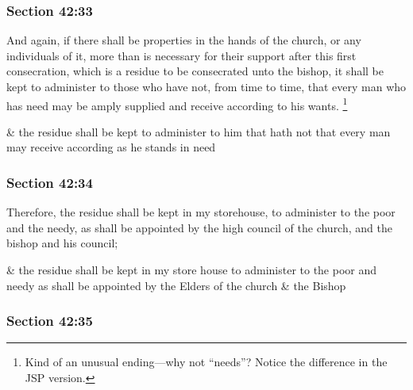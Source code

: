	\subsubsection{Section 42:33} %
		\label{DC42-33}

		And again, if there shall be properties in the hands of the church, or any individuals of it, more than is necessary for their support after this first consecration, which is a residue to be consecrated unto the bishop, it shall be kept to administer to those who have not, from time to time, that every man who has need may be amply supplied and receive according to his wants.%
			\footnote{%
				Kind of an unusual ending---why not ``needs''? Notice the difference in the JSP version.
				}

		\begin{framed}
		\scriptsize
			\begin{compactdesc}
				\item[JSP] \& the residue shall be kept to administer to him that hath not that every man may receive according as he stands in need
			\end{compactdesc}
		\end{framed}

	\subsubsection{Section 42:34} %
		\label{DC42-34}

		Therefore, the residue shall be kept in my storehouse, to administer to the poor and the needy, as shall be appointed by the high council of the church, and the bishop and his council;

		\begin{framed}
		\scriptsize
			\begin{compactdesc}
				\item[JSP] \& the residue shall be kept in my store house to administer to the poor and needy as shall be appointed by the Elders of the church \& the Bishop
			\end{compactdesc}
		\end{framed}

	\subsubsection{Section 42:35} %
		\label{DC42-35}

